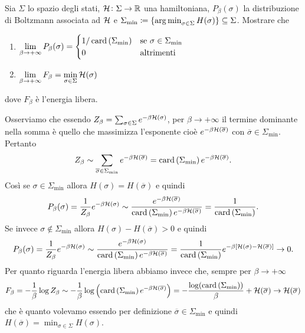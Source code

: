 \begin{exercise}
    Sia $ \Sigma $ lo spazio degli stati, $ \mathcal{H} \colon \Sigma \to \mathbb{R} $ una hamiltoniana, $ P_\beta(\sigma) $ la distribuzione di Boltzmann associata ad $ \mathcal{H} $ e $ \Sigma_\mathrm{min} \coloneqq \{\operatorname*{arg\, min}_{\sigma \in \Sigma} H(\sigma)\} \subseteq \Sigma $. Mostrare che
    \begin{enumerate}
        \item $ \displaystyle \lim_{\beta \to +\infty} P_\beta(\sigma) = \begin{cases}
        1/\operatorname{card}{(\Sigma_\mathrm{min})} & \text{se $ \sigma \in \Sigma_\mathrm{min} $} \\
        0 & \text{altrimenti}
        \end{cases} $
        \item $ \displaystyle \lim_{\beta \to +\infty} F_\beta = \min_{\sigma \in \Sigma} \mathcal{H}(\sigma) $
    \end{enumerate}
    dove $ F_\beta $ è l'energia libera.
\end{exercise}
\begin{solution}
    Osserviamo che essendo $ Z_\beta = \sum_{\sigma \in \Sigma} e^{-\beta \mathcal{H}(\sigma)} $, per $ \beta \to +\infty $ il termine dominante nella somma è quello che massimizza l'esponente cioè $ e^{-\beta \mathcal{H}(\overline{\sigma})} $ con $ \overline{\sigma} \in \Sigma_\mathrm{min} $. Pertanto
    \[
        Z_\beta \sim \sum_{\overline{\sigma} \in \Sigma_\mathrm{min}} e^{-\beta \mathcal{H}(\overline{\sigma})} = \operatorname{card}{(\Sigma_\mathrm{min})} \, e^{-\beta \mathcal{H}(\overline{\sigma})}.
    \]
    Così se $ \sigma \in \Sigma_\mathrm{min} $ allora $ H(\sigma) = H(\overline{\sigma}) $ e quindi
    \[
        P_\beta(\sigma) = \frac{1}{Z_\beta} e^{-\beta \mathcal{H}(\sigma)} \sim \frac{e^{-\beta \mathcal{H}(\overline\sigma)}}{\operatorname{card}{(\Sigma_\mathrm{min})} \, e^{-\beta \mathcal{H}(\overline{\sigma})}} = \frac{1}{\operatorname{card}{(\Sigma_\mathrm{min})}}.
    \]
    Se invece $ \sigma \notin \Sigma_\mathrm{min} $ allora $ H(\sigma) - H(\overline{\sigma}) > 0 $ e quindi
    \[
    P_\beta(\sigma) = \frac{1}{Z_\beta} e^{-\beta \mathcal{H}(\sigma)} \sim \frac{e^{-\beta \mathcal{H}(\sigma)}}{\operatorname{card}{(\Sigma_\mathrm{min})} \, e^{-\beta \mathcal{H}(\overline{\sigma})}} = \frac{1}{\operatorname{card}{(\Sigma_\mathrm{min})}} e^{-\beta[\mathcal{H}(\sigma) - \mathcal{H}(\overline \sigma)]} \to 0.
    \]
    Per quanto riguarda l'energia libera abbiamo invece che, sempre per $ \beta \to +\infty $
    \[
        F_\beta = -\frac{1}{\beta} \log Z_\beta \sim -\frac{1}{\beta} \log\left(\operatorname{card}{(\Sigma_\mathrm{min})} \, e^{-\beta \mathcal{H}(\overline{\sigma})}\right) = -\frac{\log(\operatorname{card}{(\Sigma_\mathrm{min})})}{\beta} + \mathcal{H}(\overline{\sigma}) \to \mathcal{H}(\overline{\sigma})
    \]
    che è quanto volevamo essendo per definizione $ \overline{\sigma} \in \Sigma_\mathrm{min} $ e quindi $ H(\overline{\sigma})= \min_{\sigma \in \Sigma} H(\sigma) $.
\end{solution}

